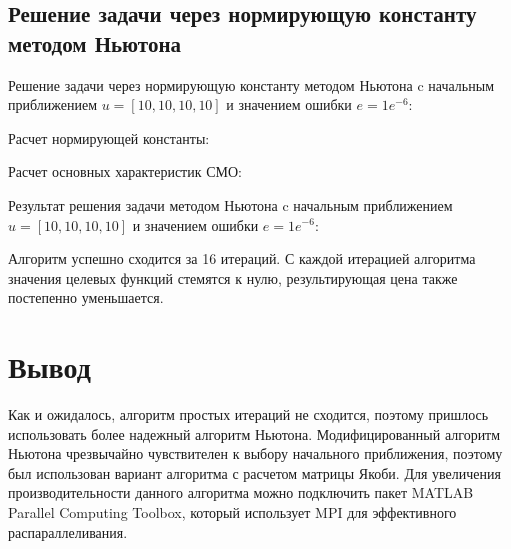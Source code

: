 \documentclass[14pt,a4paper,report]{report}
\begin{document}
\subsection{Решение задачи через нормирующую константу методом Ньютона}

Решение задачи через нормирующую константу методом Ньютона c начальным приближением $u=[10, 10, 10, 10]$ и значением ошибки $e=1e^{-6}$:



Расчет нормирующей константы:



Расчет основных характеристик СМО:



Результат решения задачи методом Ньютона  c начальным приближением $u=[10, 10, 10, 10]$ и значением ошибки $e=1e^{-6}$:



Алгоритм успешно сходится за 16 итераций. С каждой итерацией алгоритма значения целевых функций стемятся к нулю, результирующая цена также постепенно уменьшается.

\section{Вывод}

Как и ожидалось, алгоритм простых итераций не сходится, поэтому пришлось использовать более надежный алгоритм Ньютона. Модифицированный алгоритм Ньютона чрезвычайно чувствителен к выбору начального приближения, поэтому был использован вариант алгоритма с расчетом матрицы Якоби. Для увеличения производительности данного алгоритма можно подключить пакет MATLAB Parallel Computing Toolbox, который использует MPI для эффективного распараллеливания.
\end{document}
